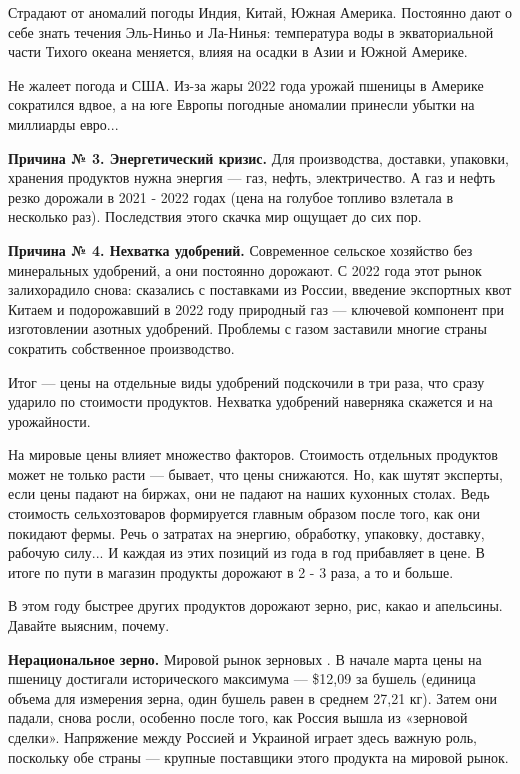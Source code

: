 Страдают от аномалий погоды Индия, Китай, Южная Америка. Постоянно дают о себе знать течения Эль-Ниньо и Ла-Нинья: температура воды в экваториальной части Тихого океана меняется, влияя на осадки в Азии и Южной Америке.

Не жалеет погода и США. Из-за жары 2022 года урожай пшеницы в Америке сократился вдвое, а на юге Европы погодные аномалии принесли убытки на миллиарды евро...

\textbf{Причина № 3. Энергетический кризис.} Для производства, доставки, упаковки, хранения продуктов нужна энергия --- газ, нефть, электричество. А газ и нефть резко дорожали в 2021 - 2022 годах (цена на голубое топливо взлетала в несколько раз). Последствия этого скачка мир ощущает до сих пор.

\textbf{Причина № 4. Нехватка удобрений.} Современное сельское хозяйство  без минеральных удобрений, а они постоянно дорожают. С 2022 года этот рынок залихорадило снова: сказались  с поставками из России, введение экспортных квот Китаем и подорожавший в 2022 году природный газ --- ключевой компонент при изготовлении азотных удобрений. Проблемы с газом заставили многие страны сократить собственное производство.

Итог --- цены на отдельные виды удобрений подскочили в три раза, что сразу ударило по стоимости продуктов. Нехватка удобрений наверняка скажется и на урожайности.

На мировые цены влияет множество факторов. Стоимость отдельных продуктов может не только расти --- бывает, что цены снижаются. Но, как шутят эксперты, если цены падают на биржах, они не падают на наших кухонных столах. Ведь стоимость сельхозтоваров формируется главным образом после того, как они покидают фермы. Речь о затратах на энергию, обработку, упаковку, доставку, рабочую силу... И каждая из этих позиций из года в год прибавляет в цене. В итоге по пути в магазин продукты дорожают в 2 - 3 раза, а то и больше.

В этом году быстрее других продуктов дорожают зерно, рис, какао и апельсины. Давайте выясним, почему.

\textbf{Нерациональное зерно.} Мировой рынок зерновых . В начале марта цены на пшеницу достигали исторического максимума --- \$12,09 за бушель (единица объема для измерения зерна, один бушель равен в среднем 27,21 кг). Затем они падали, снова росли, особенно после того, как Россия вышла из «зерновой сделки». Напряжение между Россией и Украиной играет здесь важную роль, поскольку обе страны --- крупные поставщики этого продукта на мировой рынок.

